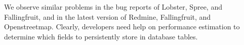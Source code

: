 
%

We observe similar problems in the bug reports of Lobster, Spree, and Fallingfruit, and in the latest version of Redmine, Fallingfruit, and Openstreetmap. Clearly, developers need help on 
performance estimation to determine which fields to persistently store in database tables. 

